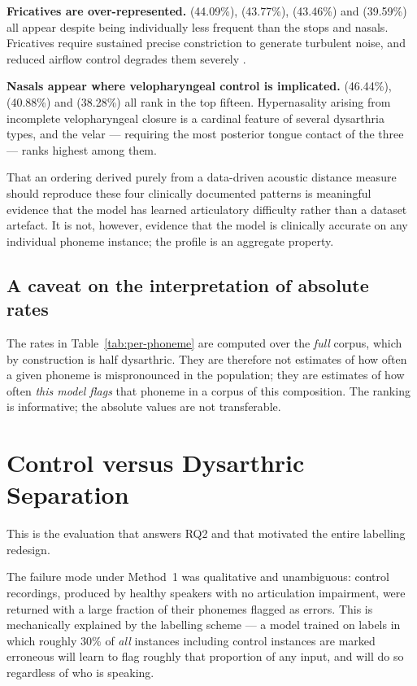 \textbf{Fricatives are over-represented.}  (44.09\%),  (43.77\%),
 (43.46\%) and  (39.59\%) all appear despite being individually
less frequent than the stops and nasals. Fricatives require sustained precise
constriction to generate turbulent noise, and reduced airflow control degrades
them severely \cite{ansel1992acoustic}.

\textbf{Nasals appear where velopharyngeal control is implicated.} 
(46.44\%),  (40.88\%) and  (38.28\%) all rank in the top fifteen.
Hypernasality arising from incomplete velopharyngeal closure is a cardinal
feature of several dysarthria types, and the velar  --- requiring the most
posterior tongue contact of the three --- ranks highest among them.

That an ordering derived purely from a data-driven acoustic distance measure
should reproduce these four clinically documented patterns is meaningful
evidence that the model has learned articulatory difficulty rather than a
dataset artefact. It is not, however, evidence that the model is clinically
accurate on any individual phoneme instance; the profile is an aggregate
property.

\subsection{A caveat on the interpretation of absolute rates}

The rates in Table~\ref{tab:per-phoneme} are computed over the \emph{full}
corpus, which by construction is half dysarthric. They are therefore not
estimates of how often a given phoneme is mispronounced in the population; they
are estimates of how often \emph{this model flags} that phoneme in a corpus of
this composition. The ranking is informative; the absolute values are not
transferable.

\section{Control versus Dysarthric Separation}
\label{sec:res-separation}

This is the evaluation that answers RQ2 and that motivated the entire labelling
redesign.

The failure mode under Method~1 was qualitative and unambiguous: control
recordings, produced by healthy speakers with no articulation impairment, were
returned with a large fraction of their phonemes flagged as errors. This is
mechanically explained by the labelling scheme --- a model trained on labels in
which roughly $30\%$ of \emph{all} instances including control instances are
marked erroneous will learn to flag roughly that proportion of any input, and
will do so regardless of who is speaking.

